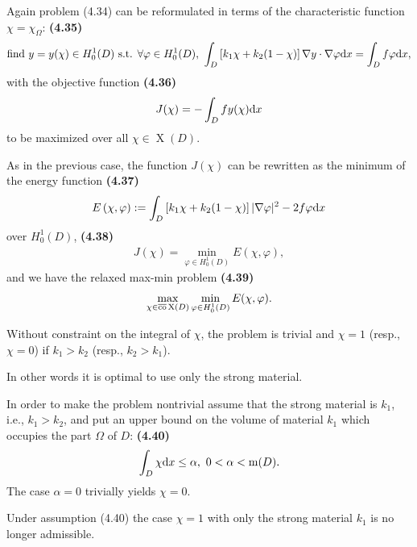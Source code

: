 \documentclass{book}
\numberwithin{equation}{section}
\begin{document}
\begin{enumerate}
    Again problem (4.34) can be reformulated in terms of the characteristic function $\chi = \chi_\Omega$: \textbf{(4.35)}
    \begin{align*}
        \mbox{find } y = y(\chi)\in H_0^1(D) \mbox{ s.t. } \forall\varphi\in H_0^1(D),\ \int_D \left[k_1\chi + k_2(1 - \chi)\right] \nabla y\cdot\nabla\varphi{\rm d}x = \int_D f\varphi{\rm d}x,
    \end{align*}
    with the objective function \textbf{(4.36)}
    \begin{align*}
        J(\chi) = -\int_D fy(\chi){\rm d}x
    \end{align*}
    to be maximized over all $\chi\in\operatorname{X}(D)$.
    
    As in the previous case, the function $J(\chi)$ can be rewritten as the minimum of the energy function \textbf{(4.37)}
    \begin{align*}
        E\left(\chi,\varphi\right) := \int_D \left[k_1\chi + k_2(1 - \chi)\right]|\nabla\varphi|^2 - 2f\varphi{\rm d}x
    \end{align*}
    over $H_0^1(D)$, \textbf{(4.38)}
    \begin{align*}
        J(\chi) = \min_{\varphi\in H_0^1(D)} E(\chi,\varphi),
    \end{align*}
    and we have the relaxed max-min problem \textbf{(4.39)}
    \begin{align*}
        \max_{\chi\in\overline{\rm co}\operatorname{X}(D)} \min_{\varphi\in H_0^1(D)} E(\chi,\varphi).
    \end{align*}
    
    Without constraint on the integral of $\chi$, the problem is trivial and $\chi = 1$ (resp., $\chi = 0$) if $k_1 > k_2$ (resp., $k_2 > k_1$).
    
    In other words it is optimal to use only the strong material.
    
    In order to make the problem nontrivial assume that the strong material is $k_1$, i.e., $k_1 > k_2$, and put an upper bound on the volume of material $k_1$ which occupies the part $\Omega$ of $D$: \textbf{(4.40)}
    \begin{align*}
        \int_D \chi{\rm d}x\le\alpha,\ 0 < \alpha < \operatorname{m}(D).
    \end{align*}
    The case $\alpha = 0$ trivially yields $\chi = 0$.
    
    Under assumption (4.40) the case $\chi = 1$ with only the strong material $k_1$ is no longer admissible.
    

\end{enumerate}
\end{document}
